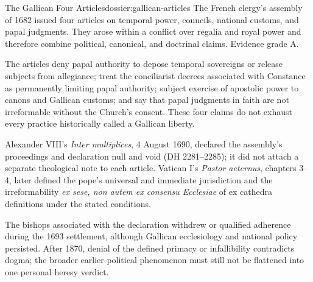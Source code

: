 \begin{heresydossier}{The Gallican Four Articles}{dossier:gallican-articles}
\objectfield The French clergy's assembly of 1682 issued four articles on temporal power, councils, national customs, and papal judgments. They arose within a conflict over regalia and royal power and therefore combine political, canonical, and doctrinal claims. Evidence grade A.

\propositionfield The articles deny papal authority to depose temporal sovereigns or release subjects from allegiance; treat the conciliarist decrees associated with Constance as permanently limiting papal authority; subject exercise of apostolic power to canons and Gallican customs; and say that papal judgments in faith are not irreformable without the Church's consent. These four claims do not exhaust every practice historically called a Gallican liberty.

\responsefield Alexander VIII's \emph{Inter multiplices}, 4 August 1690, declared the assembly's proceedings and declaration null and void (DH 2281--2285); it did not attach a separate theological note to each article. Vatican I's \emph{Pastor aeternus}, chapters 3--4, later defined the pope's universal and immediate jurisdiction and the irreformability \emph{ex sese, non autem ex consensu Ecclesiae} of ex cathedra definitions under the stated conditions.

\aftermathfield The bishops associated with the declaration withdrew or qualified adherence during the 1693 settlement, although Gallican ecclesiology and national policy persisted. After 1870, denial of the defined primacy or infallibility contradicts dogma; the broader earlier political phenomenon must still not be flattened into one personal heresy verdict.
\end{heresydossier}

